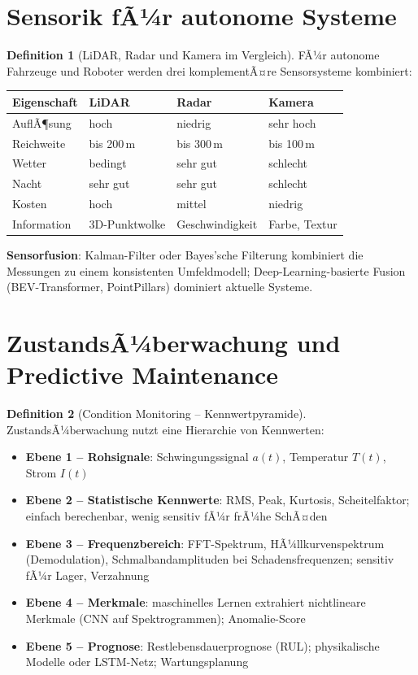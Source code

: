 ﻿\documentclass[a4paper,12pt]{report}
\theoremstyle{definition}
\newtheorem{definition}{Definition}
\begin{document}
\section{Sensorik fÃ¼r autonome Systeme}

\begin{definition}[LiDAR, Radar und Kamera im Vergleich]
FÃ¼r autonome Fahrzeuge und Roboter werden drei komplementÃ¤re Sensorsysteme kombiniert:
\begin{center}
\begin{tabular}{llll}
\toprule
Eigenschaft & LiDAR & Radar & Kamera \\
\midrule
AuflÃ¶sung & hoch & niedrig & sehr hoch \\
Reichweite & bis 200\,m & bis 300\,m & bis 100\,m \\
Wetter & bedingt & sehr gut & schlecht \\
Nacht & sehr gut & sehr gut & schlecht \\
Kosten & hoch & mittel & niedrig \\
Information & 3D-Punktwolke & Geschwindigkeit & Farbe, Textur \\
\bottomrule
\end{tabular}
\end{center}
\textbf{Sensorfusion}: Kalman-Filter oder Bayes'sche Filterung kombiniert
die Messungen zu einem konsistenten Umfeldmodell; Deep-Learning-basierte
Fusion (BEV-Transformer, PointPillars) dominiert aktuelle Systeme.
\end{definition}

\section{ZustandsÃ¼berwachung und Predictive Maintenance}

\begin{definition}[Condition Monitoring -- Kennwertpyramide]
ZustandsÃ¼berwachung nutzt eine Hierarchie von Kennwerten:
\begin{itemize}
    \item[-] \textbf{Ebene 1 -- Rohsignale}: Schwingungssignal $a(t)$, Temperatur $T(t)$, Strom $I(t)$
    \item[-] \textbf{Ebene 2 -- Statistische Kennwerte}: RMS, Peak, Kurtosis, Scheitelfaktor;
          einfach berechenbar, wenig sensitiv fÃ¼r frÃ¼he SchÃ¤den
    \item[-] \textbf{Ebene 3 -- Frequenzbereich}: FFT-Spektrum, HÃ¼llkurvenspektrum (Demodulation),
          Schmalbandamplituden bei Schadensfrequenzen; sensitiv fÃ¼r Lager, Verzahnung
    \item[-] \textbf{Ebene 4 -- Merkmale}: maschinelles Lernen extrahiert
          nichtlineare Merkmale (CNN auf Spektrogrammen); Anomalie-Score
    \item[-] \textbf{Ebene 5 -- Prognose}: Restlebensdauerprognose (RUL);
          physikalische Modelle oder LSTM-Netz; Wartungsplanung
\end{itemize}
\end{definition}
\end{document}
